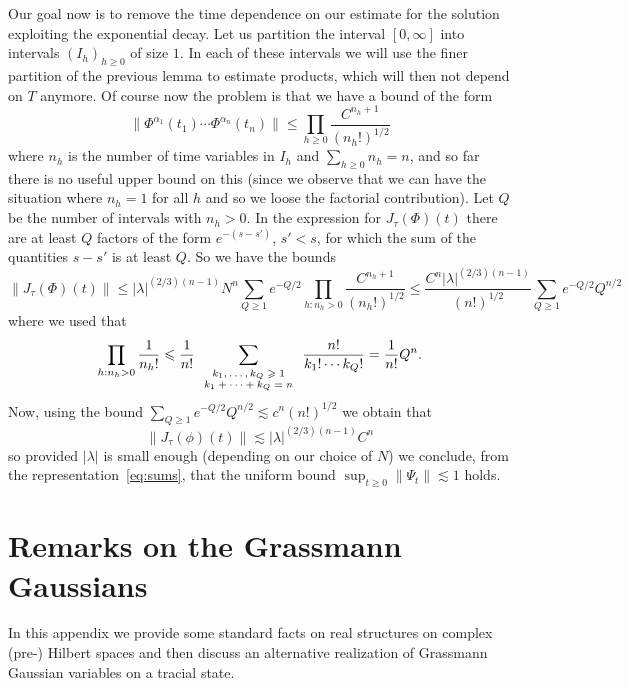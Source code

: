 \documentclass[11pt]{article}
\newcommand{\tmscript}[1]{\text{\scriptsize{$#1$}}}
\begin{document}
Our goal now is to remove the time dependence on our estimate for the
solution exploiting the exponential decay. Let us partition the interval $[0,
\infty]$ into intervals $(I_h)_{h \geqslant 0}$ of size $1$. In each of these
intervals we will use the finer partition of the previous lemma to estimate
products, which will then not depend on $T$ anymore. Of course now the problem
is that we have a bound of the form
\[ \| \Phi^{\alpha_1} (t_1) \cdots \Phi^{\alpha_n} (t_n) \| \leqslant \prod_{h
   \geqslant 0} \frac{C^{n_h + 1}}{(n_h !)^{1 / 2}} \]
where $n_h$ is the number of time variables in $I_h$ and $\sum_{h \geqslant 0}
n_h = n$, and so far there is no useful upper bound on this (since we observe
that we can have the situation where $n_h = 1$ for all $h$ and so we loose the
factorial contribution). Let $Q$ be the number of intervals with $n_h > 0$. In
the expression for $J_{\tau} (\Phi) (t)$ there are at least $Q$ factors of the
form $e^{- (s - s')}$, $s' < s$, for which the sum of the quantities $s - s'$
is at least $Q$. So we have the bounds
\[ \| J_{\tau} (\Phi) (t) \| \leqslant | \lambda |^{(2 / 3) (n - 1)} N^n
   \sum_{Q \geqslant 1} e^{- Q / 2} \prod_{h : n_h > 0} \frac{C^{n_h +
   1}}{(n_h !)^{1 / 2}} \leqslant \frac{C^n | \lambda |^{(2 / 3) (n -
   1)}}{(n!)^{1 / 2}} \sum_{Q \geqslant 1} e^{- Q / 2} Q^{n / 2} \]
where we used that
\[ \prod_{h : n_h > 0} \frac{1}{n_h !} \leqslant \frac{1}{n!}
   \sum_{\tmscript{\begin{array}{c}
     k_1, \ldots, k_Q \geqslant 1\\
     k_1 + \cdots + k_Q = n
   \end{array}}} \frac{n!}{k_1 ! \cdots k_Q !} = \frac{1}{n!} Q^n . \]
Now, using the bound $\sum_{Q \geqslant 1} e^{- Q / 2} Q^{n / 2} \lesssim c^n
(n!)^{1 / 2}$ we obtain that
\[ \| J_{\tau} (\phi) (t) \| \lesssim | \lambda |^{(2 / 3) (n - 1)} C^n \]
so provided $| \lambda |$ is small enough (depending on our choice of $N$) we
conclude, from the representation~{\eqref{eq:sums}}, that the uniform bound
$\sup_{t \geqslant 0} \| \Psi_t \| \lesssim 1$ holds.

\section{Remarks on the Grassmann Gaussians}\label{app:GP}

In this appendix we provide some standard facts on real structures on complex
(pre-) Hilbert spaces and then discuss an alternative realization of Grassmann
Gaussian variables on a tracial state.
\end{document}
